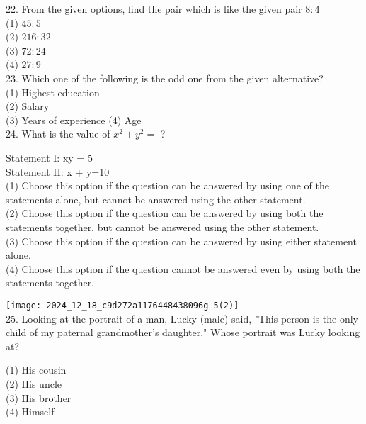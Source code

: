 \documentclass[10pt]{article}
\begin{document}
22. From the given options, find the pair which is like the given pair $8: 4$\\
(1) $45: 5$\\
(2) $216: 32$\\
(3) $72: 24$\\
(4) $27: 9$\\
23. Which one of the following is the odd one from the given alternative?\\
(1) Highest education\\
(2) Salary\\
(3) Years of experience (4) Age\\
24. What is the value of $x^{2}+y^{2}=$ ?

Statement I: xy = 5\\
Statement II: x + y=10\\
(1) Choose this option if the question can be answered by using one of the statements alone, but cannot be answered using the other statement.\\
(2) Choose this option if the question can be answered by using both the statements together, but cannot be answered using the other statement.\\
(3) Choose this option if the question can be answered by using either statement alone.\\
(4) Choose this option if the question cannot be answered even by using both the statements together.


\texttt{[image: 2024\_12\_18\_c9d272a1176448438096g-5(2)]}\\
25. Looking at the portrait of a man, Lucky (male) said, "This person is the only child of my paternal grandmother's daughter." Whose portrait was Lucky looking at?

\begin{enumerate}
(1) His cousin\\
(2) His uncle\\
(3) His brother\\
(4) Himself
\end{enumerate}
\end{document}
